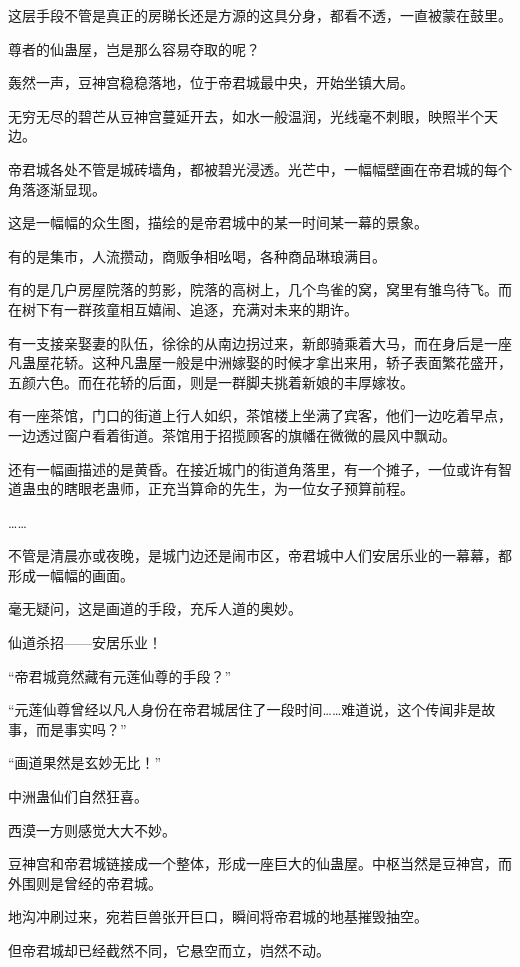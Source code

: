 \begin{this_body}
这层手段不管是真正的房睇长还是方源的这具分身，都看不透，一直被蒙在鼓里。

尊者的仙蛊屋，岂是那么容易夺取的呢？

轰然一声，豆神宫稳稳落地，位于帝君城最中央，开始坐镇大局。

无穷无尽的碧芒从豆神宫蔓延开去，如水一般温润，光线毫不刺眼，映照半个天边。

帝君城各处不管是城砖墙角，都被碧光浸透。光芒中，一幅幅壁画在帝君城的每个角落逐渐显现。

这是一幅幅的众生图，描绘的是帝君城中的某一时间某一幕的景象。

有的是集市，人流攒动，商贩争相吆喝，各种商品琳琅满目。

有的是几户房屋院落的剪影，院落的高树上，几个鸟雀的窝，窝里有雏鸟待飞。而在树下有一群孩童相互嬉闹、追逐，充满对未来的期许。

有一支接亲娶妻的队伍，徐徐的从南边拐过来，新郎骑乘着大马，而在身后是一座凡蛊屋花轿。这种凡蛊屋一般是中洲嫁娶的时候才拿出来用，轿子表面繁花盛开，五颜六色。而在花轿的后面，则是一群脚夫挑着新娘的丰厚嫁妆。

有一座茶馆，门口的街道上行人如织，茶馆楼上坐满了宾客，他们一边吃着早点，一边透过窗户看着街道。茶馆用于招揽顾客的旗幡在微微的晨风中飘动。

还有一幅画描述的是黄昏。在接近城门的街道角落里，有一个摊子，一位或许有智道蛊虫的瞎眼老蛊师，正充当算命的先生，为一位女子预算前程。

……

不管是清晨亦或夜晚，是城门边还是闹市区，帝君城中人们安居乐业的一幕幕，都形成一幅幅的画面。

毫无疑问，这是画道的手段，充斥人道的奥妙。

仙道杀招——安居乐业！

“帝君城竟然藏有元莲仙尊的手段？”

“元莲仙尊曾经以凡人身份在帝君城居住了一段时间……难道说，这个传闻非是故事，而是事实吗？”

“画道果然是玄妙无比！”

中洲蛊仙们自然狂喜。

西漠一方则感觉大大不妙。

豆神宫和帝君城链接成一个整体，形成一座巨大的仙蛊屋。中枢当然是豆神宫，而外围则是曾经的帝君城。

地沟冲刷过来，宛若巨兽张开巨口，瞬间将帝君城的地基摧毁抽空。

但帝君城却已经截然不同，它悬空而立，岿然不动。


\end{this_body}
